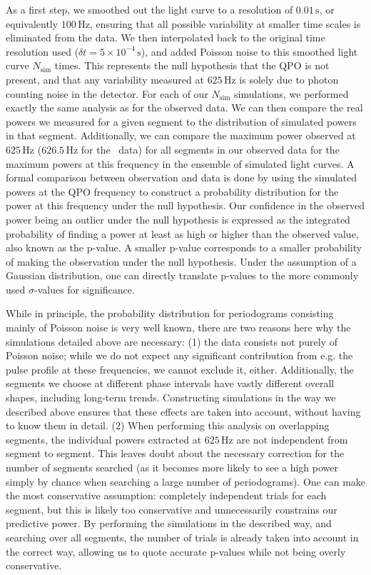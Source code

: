 \documentclass{emulateapj}
\begin{document}
As a first step, we smoothed out the light curve to a resolution of $0.01 \, \mathrm{s}$, or equivalently $100 \, \mathrm{Hz}$, ensuring that all possible variability at smaller time scales is eliminated from the data. We then interpolated back to the original time resolution used ($\delta t = 5\times10^{-4} \, \mathrm{s}$), and added Poisson noise to this smoothed light curve $N_{\mathrm{sim}}$ times. This represents the null hypothesis that the QPO is not present, and that any variability measured at $625 \, \mathrm{Hz}$ is solely due to photon counting noise in the detector. For each of our $N_{\mathrm{sim}}$ simulations, we performed exactly the same analysis as for the observed data. We can then compare the real powers we measured for a given segment to the distribution of simulated powers in that segment. Additionally, we can compare the maximum power observed at $625 \, \mathrm{Hz}$ ($626.5 \, \mathrm{Hz}$ for the \rhessi\ data) for all segments in our observed data for the maximum powers at this frequency in the ensemble of simulated light curves. A formal comparison between observation and data is done by using the simulated powers at the QPO frequency to construct a probability distribution for the power at this frequency under the null hypothesis. Our confidence in the observed power being an outlier under the null hypothesis is expressed as the integrated probability of finding a power at least as high or higher than the observed value, also known as the p-value. A smaller p-value corresponds to a smaller probability of making the observation under the null hypothesis. Under the assumption of a Gaussian distribution, one can directly translate p-values to the more commonly used $\sigma$-values for significance. 

While in principle, the probability distribution for periodograms consisting mainly of Poisson noise is very well known, there are two reasons here why the simulations detailed above are necessary: (1) the data consists not purely of Poisson noise; while we do not expect any significant contribution from e.g. the pulse profile at these frequencies, we cannot exclude it, either. Additionally, the segments we choose at different phase intervals have vastly different overall shapes, including long-term trends. Constructing simulations in the way we described above ensures that these effects are taken into account, without having to know them in detail. (2) When performing this analysis on overlapping segments, the individual powers extracted at $625 \, \mathrm{Hz}$ are not independent from segment to segment. This leaves doubt about the necessary correction for the number of segments searched (as it becomes more likely to see a high power simply by chance when searching a large number of periodograms). One can make the most conservative assumption: completely independent trials for each segment, but this is likely too conservative and unnecessarily constrains our predictive power. By performing the simulations in the described way, and searching over all segments, the number of trials is already taken into account in the correct way, allowing us to quote accurate p-values while not being overly conservative.
\end{document}
